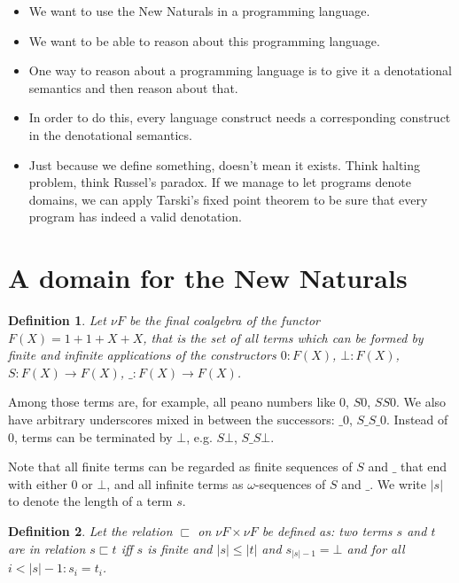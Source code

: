 \documentclass[a4paper]{article}
\newcommand{\arr}{\rightarrow}
\newtheorem{defNuF}{Definition}[section]
\newtheorem{defStrictOrderNuF}[defNuF]{Definition}
\begin{document}
\begin{itemize}

\item We want to use the New Naturals in a programming language.

\item We want to be able to reason about this programming language.

\item One way to reason about a programming language is to give it a
denotational semantics and then reason about that.

\item In order to do this, every language construct needs a corresponding
construct in the denotational semantics.

\item Just because we define something, doesn't mean it exists.  Think halting
problem, think Russel's paradox. If we manage to let programs denote domains,
we can apply Tarski's fixed point theorem to be sure that every program has
indeed a valid denotation.

\end{itemize}

\section{A domain for the New Naturals}

\begin{defNuF}

Let $\nu F$ be the final coalgebra of the functor $F(X) = 1 + 1 + X + X$, that
is the set of all terms which can be formed by finite and infinite applications
of the constructors $0:F(X)$, $\bot:F(X)$, $S:F(X) \arr F(X)$, $\_:F(X) \arr
F(X)$.

\end{defNuF}


Among those terms are, for example, all peano numbers like $0$, $S0$, $SS0$.
We also have arbitrary underscores mixed in between the successors: $\_0$,
$S\_S\_0$.  Instead of $0$, terms can be terminated by $\bot$, e.g.  $S\bot$,
$S\_S\bot$.

Note that all finite terms can be regarded as finite sequences of $S$ and $\_$
that end with either $0$ or $\bot$, and all infinite terms as
$\omega$-sequences of $S$ and $\_$.  We write $|s|$ to denote the length of a
term $s$.



\begin{defStrictOrderNuF}

Let the relation $\sqsubset$ on $\nu F \times \nu F$ be defined as: two
terms $s$ and $t$ are in relation $s \sqsubset t$ iff $s$ is finite and $|s|
\leq |t|$ and $s_{|s|-1} = \bot$ and for all $i < |s|-1: s_i = t_i$.

\end{defStrictOrderNuF}
\end{document}
